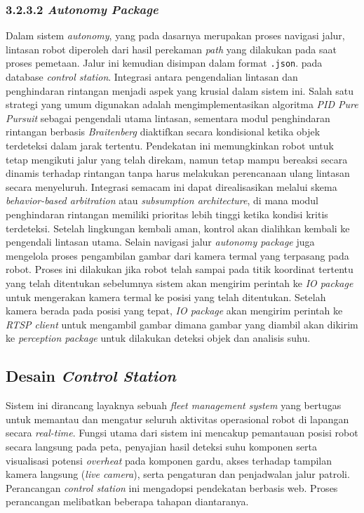 \subsubsection{3.2.3.2 \emph{Autonomy Package}}
Dalam sistem \emph{autonomy}, yang pada dasarnya merupakan proses navigasi jalur, lintasan robot diperoleh dari hasil perekaman \emph{path} yang dilakukan pada saat proses pemetaan. Jalur ini kemudian disimpan dalam format \texttt{.json}. pada database \emph{control station}. Integrasi antara pengendalian lintasan dan penghindaran rintangan menjadi aspek yang krusial dalam sistem ini. Salah satu strategi yang umum digunakan adalah mengimplementasikan algoritma \emph{PID Pure Pursuit} sebagai pengendali utama lintasan, sementara modul penghindaran rintangan berbasis \emph{Braitenberg} diaktifkan secara kondisional ketika objek terdeteksi dalam jarak tertentu. Pendekatan ini memungkinkan robot untuk tetap mengikuti jalur yang telah direkam, namun tetap mampu bereaksi secara dinamis terhadap rintangan tanpa harus melakukan perencanaan ulang lintasan secara menyeluruh. Integrasi semacam ini dapat direalisasikan melalui skema \emph{behavior-based arbitration} atau \emph{subsumption architecture}, di mana modul penghindaran rintangan memiliki prioritas lebih tinggi ketika kondisi kritis terdeteksi. Setelah lingkungan kembali aman, kontrol akan dialihkan kembali ke pengendali lintasan utama. Selain navigasi jalur \emph{autonomy package} juga mengelola proses pengambilan gambar dari kamera termal yang terpasang pada robot. Proses ini dilakukan jika robot telah sampai pada titik koordinat tertentu yang telah ditentukan sebelumnya sistem akan mengirim perintah ke \emph{IO package} untuk mengerakan kamera termal ke posisi yang telah ditentukan. Setelah kamera berada pada posisi yang tepat, \emph{IO package} akan mengirim perintah ke \emph{RTSP client} untuk mengambil gambar dimana gambar yang diambil akan dikirim ke \emph{perception package} untuk dilakukan deteksi objek dan analisis suhu. 

\subsection{Desain \textit{Control Station}}
Sistem ini dirancang layaknya sebuah \emph{fleet management system} yang bertugas untuk memantau dan mengatur seluruh aktivitas operasional robot di lapangan secara \emph{real-time}. Fungsi utama dari sistem ini mencakup pemantauan posisi robot secara langsung pada peta, penyajian hasil deteksi suhu komponen serta visualisasi potensi \emph{overheat} pada komponen gardu, akses terhadap tampilan kamera langsung (\emph{live camera}), serta pengaturan dan penjadwalan jalur patroli.  Perancangan \emph{control station} ini mengadopsi pendekatan berbasis web. Proses perancangan melibatkan beberapa tahapan diantaranya.

